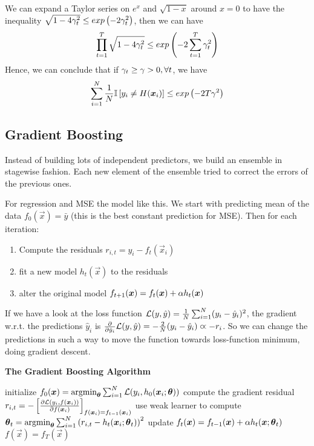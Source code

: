 We can expand a Taylor series on $e^x$ and $\sqrt{1-x}$ around $x=0$ to have the inequality $\sqrt{1-4\gamma_t^2}\leq exp\left(-2\gamma_t^2\right)$, then we can have
\begin{align*}
\prod_{t=1}^T\sqrt{1-4\gamma_t^2}\leq exp\left(-2\sum_{t=1}^T\gamma_t^2\right)
\end{align*}
Hence, we can conclude that if $\gamma_t\geq\gamma>0,\forall t$, we have
\begin{align*}
\sum_{i=1}^N\frac{1}{N}\mathbb{I}\left[y_i\neq H(\boldsymbol{x}_i)\right]\leq exp\left(-2T\gamma^2\right)
\end{align*}

\subsection{Gradient Boosting}

Instead of building lots of independent predictors, we build an ensemble in stagewise fashion. Each new element of the ensemble tried to correct the errors of the previous ones.

For regression and MSE the model like this. We start with predicting mean of the data $f_0(\vec{x})=\bar{y}$ (this is the best constant prediction for MSE). Then for each iteration:
\begin{enumerate}
	\item Compute the residuals $r_{i,t}=y_i-f_t(\vec{x}_i)$
	\item fit a new model $h_t(\vec{x})$ to the residuals
	\item alter the original model $f_{t+1}(\boldsymbol{x})=f_t(\boldsymbol{x})+\alpha h_t(\boldsymbol{x})$
\end{enumerate}
If we have a look at the loss function $\mathcal{L}(y,\hat{y})=\frac{1}{N}\sum_{i=1}^N(y_i-\hat{y}_i)^2$, the gradient w.r.t. the predictions $\hat{y}_i$ is $\frac{\partial}{\partial\hat{y}_i}\mathcal{L}(y,\hat{y})=-\frac{2}{N}(y_i-\hat{y}_i)\varpropto-r_i$. So we can change the predictions in such a way to move the function towards loss-function minimum, doing gradient descent.
\begin{algorithm}[H]
	\caption*{\bf The Gradient Boosting Algorithm}
	\begin{algorithmic}
		\State initialize $f_0(\vec{x})=\argmin_{\vec{\th}}\sum_{i=1}^N\cL(y_i,h_0(\vec{x}_i;\vec{\th}))$
		\State compute the gradient residual $r_{i,t}=-\left[\frac{\partial\mathcal{L}(y_i,f(\boldsymbol{x}_i))}{\partial f(\boldsymbol{x}_i)}\right]_{f(\boldsymbol{x}_i)=f_{t-1}(\boldsymbol{x}_i)}$
		\State use weak learner to compute $\vec{\th}_t=\argmin_{\vec{\th}}\sum_{i=1}^N\left(r_{i,t}-h_t(\vec{x}_i;\vec{\th}_t)\right)^2$
		\State update $f_t(\boldsymbol{x})=f_{t-1}(\boldsymbol{x})+\alpha h_t(\boldsymbol{x};\boldsymbol{\theta}_t)$
		\EndFor
		\State \Return $f(\vec{x})=f_T(\vec{x})$
	\end{algorithmic}
\end{algorithm}

